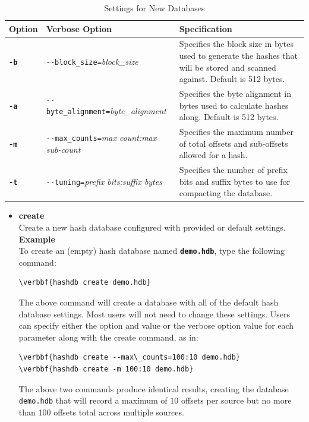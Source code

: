 \documentclass[11pt,fleqn]{article} %
\begin{document}
\begin{table}[!ht]
\centering
\caption{Settings for New Databases}
\label{tab:hashDBSettings}
\begin{tabular}{|p{1.5 cm}|p{8 cm}|p{4 cm}|}
\hline \hline
\textbf{Option} & \textbf{Verbose Option} & \textbf{Specification} \\
\hline
\textbf{\texttt{-b}} & \verb+--block_size=+\textit{block\_size} & Specifies the block size in bytes used to generate the hashes that will be stored and scanned against. Default is 512 bytes.  \\
\hline
\textbf{\texttt{-a}} & \verb+--byte_alignment=+\textit{byte\_alignment} & Specifies the byte alignment in bytes used to calculate hashes along. Default is 512 bytes.  \\
\hline
\textbf{\texttt{-m}} & \verb+--max_counts=+\textit{max count:max sub-count} & Specifies the maximum number of total offsets and sub-offsets allowed for a hash.\\
\hline
\textbf{\texttt{-t}} & \verb+--tuning=+\textit{prefix bits:suffix bytes} & Specifies the number of prefix bits and suffix bytes to use for compacting the database.\\
\hline
\end{tabular}
\end{table}

\begin{itemize}
\item \textbf{create}\\
Create a new hash database configured with provided or default settings.\\

\textbf{Example}\\
To create an (empty) hash database named \textbf{\texttt{demo.hdb}}, type the following command:
\begin{Verbatim}[commandchars=\\\{\}]
\verbbf{hashdb create demo.hdb}
\end{Verbatim}
The above command will create a database with all of the default hash database settings. Most users will not need to change these settings.
Users can specify either the option and value or the verbose option value for each parameter along with the create command, as in:\\
\begin{Verbatim}[commandchars=\\\{\}]
\verbbf{hashdb create --max\_counts=100:10 demo.hdb}
\verbbf{hashdb create -m 100:10 demo.hdb}
\end{Verbatim}
The above two commands produce identical results, creating the database \texttt{demo.hdb} that will record a maximum of 10 offsets per source but no more than 100 offsets total across multiple sources.\\
\end{itemize}
\end{document}

